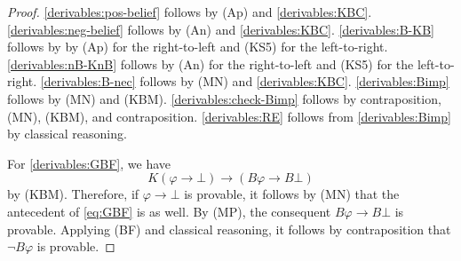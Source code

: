 \documentclass[12pt]{article}
\theoremstyle{definition}
\begin{document}
\begin{proof}
  \ref{derivables:pos-belief} follows by (Ap) and
  \ref{derivables:KBC}.  \ref{derivables:neg-belief} follows by (An)
  and \ref{derivables:KBC}.  \ref{derivables:B-KB} follows by by (Ap)
  for the right-to-left and (KS5) for the left-to-right.
  \ref{derivables:nB-KnB} follows by (An) for the right-to-left and
  (KS5) for the left-to-right.  \ref{derivables:B-nec} follows by (MN)
  and \ref{derivables:KBC}.  \ref{derivables:Bimp} follows by (MN) and
  (KBM).  \ref{derivables:check-Bimp} follows by contraposition, (MN),
  (KBM), and contraposition.  \ref{derivables:RE} follows from
  \ref{derivables:Bimp} by classical reasoning.

  For \ref{derivables:GBF}, we have
  \begin{equation}
    K(\varphi\to\bot)\to(B\varphi\to B\bot)
    \label{eq:GBF}
  \end{equation}
  by (KBM).  Therefore, if $\varphi\to\bot$ is provable, it follows by
  (MN) that the antecedent of \eqref{eq:GBF} is as well.  By (MP), the
  consequent $B\varphi\to B\bot$ is provable.  Applying (BF) and
  classical reasoning, it follows by contraposition that $\lnot
  B\varphi$ is provable.
\end{proof}
\end{document}
